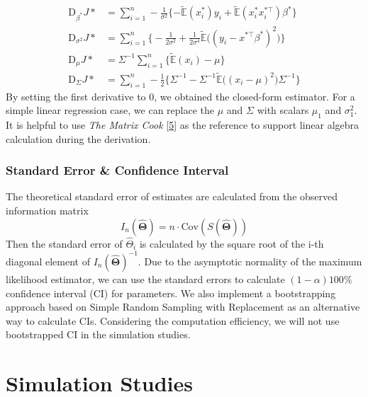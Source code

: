 \documentclass[
  twocolumn]{article}
\begin{document}
\[
\begin{aligned}
\boldsymbol{\mathrm{D}}_{{\beta}^{*}}J* &= 
\sum_{i=1}^{n} - \frac{1}{\sigma^2} \{-\tilde{\mathbb{E}}(x_i^{*})y_i + \tilde{\mathbb{E}}(x_i^{*}x_i^{*\top})\beta^{*}\} \\
\boldsymbol{\mathrm{D}}_{{\sigma}^2}J* &=
\sum_{i=1}^{n} \Big\{ - \frac{1}{2\sigma^2} + \frac{1}{2\sigma^4} \tilde{\mathbb{E}}\big((y_i-x^{*\top}\beta^{*})^2\big) \Big\}\\
\boldsymbol{\mathrm{D}}_{\mu}J* &= \Sigma^{-1} \sum_{i=1}^{n} \Big\{\tilde{\mathbb{E}}(x_i) - \mu \Big\}\\
\boldsymbol{\mathrm{D}}_{\Sigma}J* &= 
\sum_{i=1}^{n} -\frac{1}{2} \Big\{ \Sigma^{-1} - \Sigma^{-1} \tilde{\mathbb{E}}\big((x_i-\mu)^2\big) \Sigma^{-1} \Big\}
\end{aligned}
\] By setting the first derivative to 0, we obtained the closed-form
estimator. For a simple linear regression case, we can replace the
\(\mu\) and \(\Sigma\) with scalars \(\mu_1\) and \(\sigma_{1}^{2}\). It
is helpful to use \emph{The Matrix Cook}
{[}\protect\hyperlink{ref-petersen2008matrix}{5}{]} as the reference to
support linear algebra calculation during the derivation.

\hypertarget{standard-error-confidence-interval}{%
\subsubsection{Standard Error \& Confidence
Interval}\label{standard-error-confidence-interval}}

The theoretical standard error of estimates are calculated from the
observed information matrix \[ 
I_n (\hat{\boldsymbol{\Theta}}) = n \cdot \mathrm{Cov}(S(\hat{\boldsymbol{\Theta}}))
\] Then the standard error of \(\hat\Theta_i\) is calculated by the
square root of the i-th diagonal element of
\(I_n(\hat{\boldsymbol{\Theta}})^{-1}\). Due to the asymptotic normality
of the maximum likelihood estimator, we can use the standard errors to
calculate \((1-\alpha)100\%\) confidence interval (CI) for parameters.
We also implement a bootstrapping approach based on Simple Random
Sampling with Replacement as an alternative way to calculate CIs.
Considering the computation efficiency, we will not use bootstrapped CI
in the simulation studies.

\hypertarget{simulation-studies}{%
\section{Simulation Studies}\label{simulation-studies}}
\end{document}
